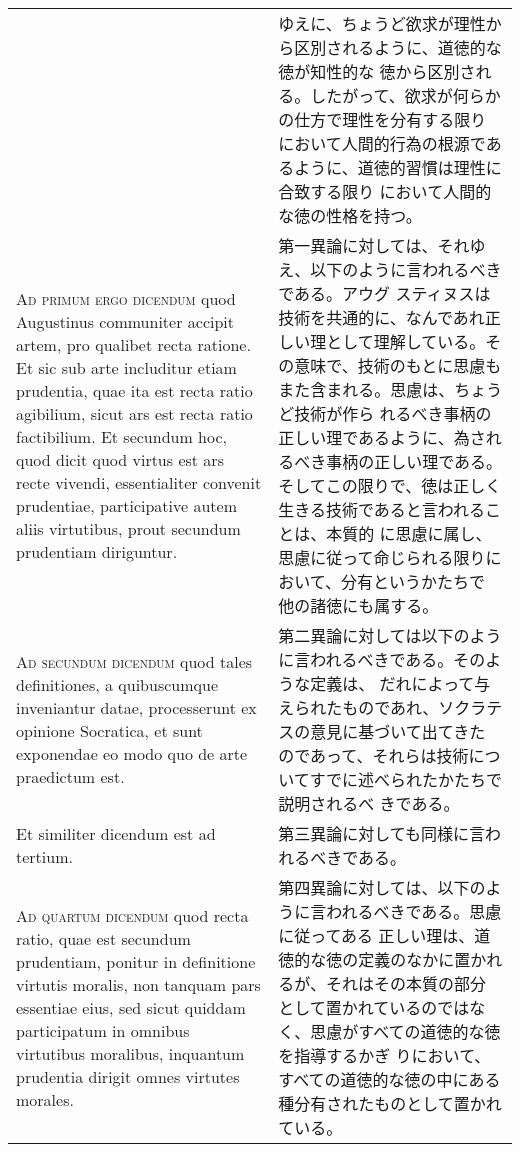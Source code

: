 \documentclass[10pt]{jsarticle}
\begin{document}
\begin{longtable}{p{21em}p{21em}}
&

 ゆえに、ちょうど欲求が理性から区別されるように、道徳的な徳が知性的な
 徳から区別される。したがって、欲求が何らかの仕方で理性を分有する限り
 において人間的行為の根源であるように、道徳的習慣は理性に合致する限り
 において人間的な徳の性格を持つ。

 
\\


{\scshape Ad primum ergo dicendum} quod Augustinus communiter accipit
artem, pro qualibet recta ratione. Et sic sub arte includitur etiam
prudentia, quae ita est recta ratio agibilium, sicut ars est recta
ratio factibilium. Et secundum hoc, quod dicit quod virtus est ars
recte vivendi, essentialiter convenit prudentiae, participative autem
aliis virtutibus, prout secundum prudentiam diriguntur.

&

 第一異論に対しては、それゆえ、以下のように言われるべきである。アウグ
 スティヌスは技術を共通的に、なんであれ正しい理として理解している。そ
 の意味で、技術のもとに思慮もまた含まれる。思慮は、ちょうど技術が作ら
 れるべき事柄の正しい理であるように、為されるべき事柄の正しい理である。
 そしてこの限りで、徳は正しく生きる技術であると言われることは、本質的
 に思慮に属し、思慮に従って命じられる限りにおいて、分有というかたちで
 他の諸徳にも属する。
 
\\



{\scshape Ad secundum dicendum} quod tales definitiones, a
quibuscumque inveniantur datae, processerunt ex opinione Socratica, et
sunt exponendae eo modo quo de arte praedictum est.

&

 第二異論に対しては以下のように言われるべきである。そのような定義は、
 だれによって与えられたものであれ、ソクラテスの意見に基づいて出てきた
 のであって、それらは技術についてすでに述べられたかたちで説明されるべ
 きである。
 
\\


Et similiter dicendum est ad tertium.

&

 第三異論に対しても同様に言われるべきである。
 
\\



{\scshape Ad quartum dicendum} quod recta ratio, quae est secundum
prudentiam, ponitur in definitione virtutis moralis, non tanquam pars
essentiae eius, sed sicut quiddam participatum in omnibus virtutibus
moralibus, inquantum prudentia dirigit omnes virtutes morales.

&

 第四異論に対しては、以下のように言われるべきである。思慮に従ってある
 正しい理は、道徳的な徳の定義のなかに置かれるが、それはその本質の部分
 として置かれているのではなく、思慮がすべての道徳的な徳を指導するかぎ
 りにおいて、すべての道徳的な徳の中にある種分有されたものとして置かれ
 ている。

\end{longtable}
\newpage
\end{document}
